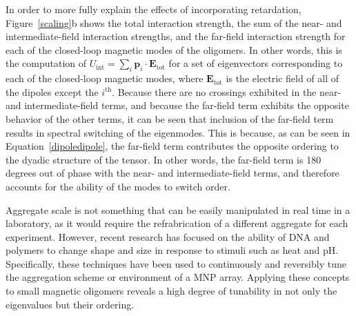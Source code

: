 \documentclass[12pt, letterpaper, twoside]{report}
\begin{document}
In order to more fully explain the effects of incorporating retardation, Figure~\ref{scaling}b shows the total interaction strength, the sum of the near- and intermediate-field interaction strengths, and the far-field interaction strength for each of the closed-loop magnetic modes of the oligomers. In other words, this is the computation of $U_{\textrm{int}} = \sum_{i}\textbf{p}_i \cdot \textbf{E}_{\textrm{tot}}$ for a set of eigenvectors corresponding to each of the closed-loop magnetic modes, where $\textbf{E}_{\textrm{tot}}$ is the electric field of all of the dipoles except the $i^{\textrm{th}}$. Because there are no crossings exhibited in the near- and intermediate-field terms, and because the far-field term exhibits the opposite behavior of the other terms, it can be seen that inclusion of the far-field term results in spectral switching of the eigenmodes. This is because, as can be seen in Equation~\ref{dipoledipole}, the far-field term contributes the opposite ordering to the dyadic structure of the tensor. In other words, the far-field term is 180 degrees out of phase with the near- and intermediate-field terms, and therefore accounts for the ability of the modes to switch order.

Aggregate scale is not something that can be easily manipulated in real time in a laboratory, as it would require the refrabrication of a different aggregate for each experiment. However, recent research has focused on the ability of DNA and polymers to change shape and size in response to stimuli such as heat and pH\cite{DanLuo2009,NaLiu2017,Ginger2017,odom_lasing,Yang2016}. Specifically, these techniques have been used to continuously and reversibly tune the aggregation scheme or environment of a MNP array. Applying these concepts to small magnetic oligomers reveals a high degree of tunability in not only the eigenvalues but their ordering.
\end{document}
